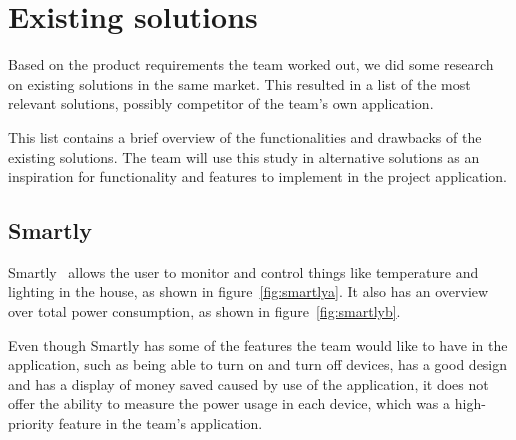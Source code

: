 \section{Existing solutions}
\label{sec:altsolution}
Based on the product requirements the team worked out, we did some research on existing solutions in the same market. This resulted in a list of the most relevant solutions, possibly competitor of the team's own application.
 
This list contains a brief overview of the functionalities and drawbacks of the existing solutions. The team will use this study in alternative solutions as an inspiration for functionality and features to implement in the project application.

\subsection{Smartly}

Smartly~\cite{smartly} allows the user to monitor and control things like temperature and lighting in the house, as shown in figure~\ref{fig:smartlya}. It also has an overview over total power consumption, as shown in figure~\ref{fig:smartlyb}.

Even though Smartly has some of the features the team would like to have in the application, such as being able to turn on and turn off devices, has a good design and has a display of money saved caused by use of the application, it does not offer the ability to measure the power usage in each device, which was a high-priority feature in the team's application.


